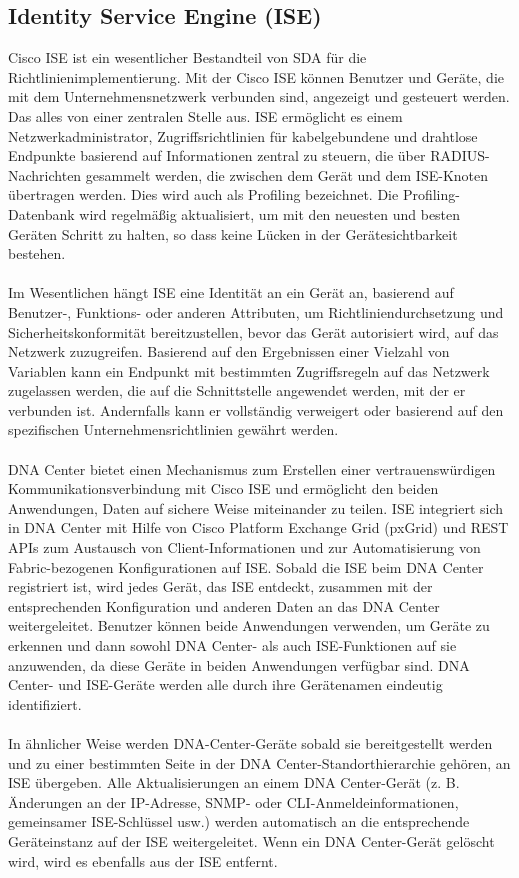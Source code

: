 \subsection{Identity Service Engine (ISE)}
Cisco ISE ist ein wesentlicher Bestandteil von SDA für die Richtlinienimplementierung. Mit der Cisco ISE können Benutzer und Geräte, die mit dem Unternehmensnetzwerk verbunden sind, angezeigt und gesteuert werden. Das alles von einer zentralen Stelle aus. ISE ermöglicht es einem Netzwerkadministrator, Zugriffsrichtlinien für kabelgebundene und drahtlose Endpunkte basierend auf Informationen zentral zu steuern, die über RADIUS-Nachrichten gesammelt werden, die zwischen dem Gerät und dem ISE-Knoten übertragen werden. Dies wird auch als Profiling bezeichnet. Die Profiling-Datenbank wird regelmäßig aktualisiert, um mit den neuesten und besten Geräten Schritt zu halten, so dass keine Lücken in der Gerätesichtbarkeit bestehen. \\
\\
Im Wesentlichen hängt ISE eine Identität an ein Gerät an, basierend auf Benutzer-, Funktions- oder anderen Attributen, um Richtliniendurchsetzung und Sicherheitskonformität bereitzustellen, bevor das Gerät autorisiert wird, auf das Netzwerk zuzugreifen. Basierend auf den Ergebnissen einer Vielzahl von Variablen kann ein Endpunkt mit bestimmten Zugriffsregeln auf das Netzwerk zugelassen werden, die auf die Schnittstelle angewendet werden, mit der er verbunden ist. Andernfalls kann er vollständig verweigert oder basierend auf den spezifischen Unternehmensrichtlinien gewährt werden. \\
\\
DNA Center bietet einen Mechanismus zum Erstellen einer vertrauenswürdigen Kommunikationsverbindung mit Cisco ISE und ermöglicht den beiden Anwendungen, Daten auf sichere Weise miteinander zu teilen. ISE integriert sich in DNA Center mit Hilfe von Cisco Platform Exchange Grid (pxGrid) und REST APIs zum Austausch von Client-Informationen und zur Automatisierung von Fabric-bezogenen Konfigurationen auf ISE. Sobald die ISE beim DNA Center registriert ist, wird jedes Gerät, das ISE entdeckt, zusammen mit der entsprechenden Konfiguration und anderen Daten an das DNA Center weitergeleitet. Benutzer können beide Anwendungen verwenden, um Geräte zu erkennen und dann sowohl DNA Center- als auch ISE-Funktionen auf sie anzuwenden, da diese Geräte in beiden Anwendungen verfügbar sind. DNA Center- und ISE-Geräte werden alle durch ihre Gerätenamen eindeutig identifiziert. \\
\\
In ähnlicher Weise werden DNA-Center-Geräte sobald sie bereitgestellt werden und zu einer bestimmten Seite in der DNA Center-Standorthierarchie gehören, an ISE übergeben. Alle Aktualisierungen an einem DNA Center-Gerät (z. B. Änderungen an der IP-Adresse, SNMP- oder CLI-Anmeldeinformationen, gemeinsamer ISE-Schlüssel usw.) werden automatisch an die entsprechende Geräteinstanz auf der ISE weitergeleitet. Wenn ein DNA Center-Gerät gelöscht wird, wird es ebenfalls aus der ISE entfernt.

